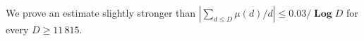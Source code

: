 \documentclass[12pt,a4paper,twoside]{article}
\def\Log{\mathop{\textbf{Log}}}
\begin{document}
  We prove an estimate slightly stronger than
  $|\sum_{d\le D}\mu(d)/d|\le 0.03/\Log D$ for every $D\ge11\,815$.
\end{document}
